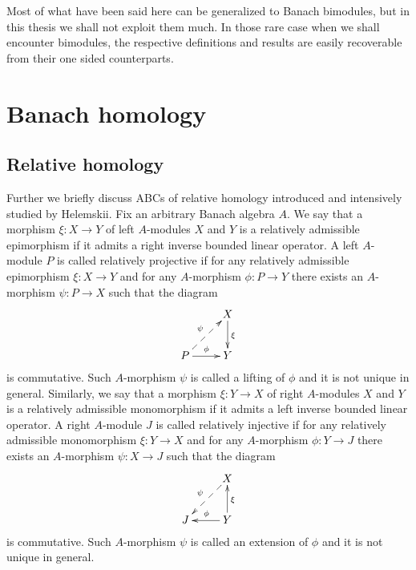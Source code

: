 Most of what have been said here can be generalized to Banach bimodules, but in this thesis we shall not exploit them much. In those rare case when we shall encounter bimodules, the respective definitions and results are easily recoverable from their one sided counterparts.


\section{Banach homology}
\label{SectionBanachHomology}


\subsection{Relative homology}
\label{SubSectionRelativeHomology}

Further we briefly discuss ABCs of relative homology introduced and intensively studied by Helemskii. Fix an arbitrary Banach algebra $A$. We say that a morphism $\xi:X\to Y$ of left $A$-modules $X$ and $Y$ is a relatively admissible epimorphism if it admits a right inverse bounded linear operator. A left $A$-module $P$ is called relatively projective if for any relatively admissible  epimorphism $\xi:X\to Y$ and for any $A$-morphism $\phi:P\to Y$ there exists an $A$-morphism $\psi:P\to X$ such that the diagram
$$
\xymatrix{
& {X} \ar[d]^{\xi}\\
{P} \ar@{-->}[ur]^{\psi} \ar[r]^{\phi} &{Y}}
$$
is commutative. Such $A$-morphism $\psi$ is called a lifting of $\phi$ and it is not unique in general. Similarly,  we say that a morphism $\xi:Y\to X$ of right $A$-modules $X$ and $Y$ is a relatively admissible monomorphism if it admits a left inverse bounded linear operator. A right $A$-module $J$ is called relatively injective if for any relatively admissible  monomorphism $\xi:Y\to X$ and for any $A$-morphism $\phi:Y\to J$ there exists an $A$-morphism $\psi:X\to J$ such that the diagram
$$
\xymatrix{
& {X} \ar@{-->}[dl]_{\psi} \\
{J} &{Y} \ar[l]_{\phi} \ar[u]_{\xi}}
$$
is commutative. Such $A$-morphism $\psi$ is called an extension of $\phi$ and it is not unique in general.

